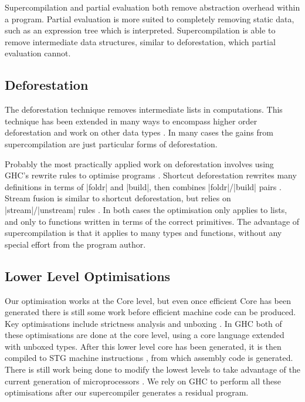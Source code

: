 \documentclass[draft]{sigplanconf}
\begin{document}
Supercompilation and partial evaluation both remove abstraction overhead within a program. Partial evaluation is more suited to completely removing static data, such as an expression tree which is interpreted. Supercompilation is able to remove intermediate data structures, similar to deforestation, which partial evaluation cannot.

\subsection{Deforestation}

The deforestation technique \cite{wadler:deforestation} removes intermediate lists in computations. This technique has been extended in many ways to encompass higher order deforestation \cite{marlow:higher_order_deforestation} and work on other data types \cite{coutts:string_fusion}. In many cases the gains from supercompilation are just particular forms of deforestation.

Probably the most practically applied work on deforestation involves using GHC's rewrite rules to optimise programs \cite{spj:rules}. Shortcut deforestation rewrites many definitions in terms of |foldr| and |build|, then combines |foldr|/|build| pairs \cite{gill:shortcut_deforestation}. Stream fusion is similar to shortcut deforestation, but relies on |stream|/|unstream| rules \cite{coutts:stream_fusion}. In both cases the optimisation only applies to lists, and only to functions written in terms of the correct primitives. The advantage of supercompilation is that it applies to many types and functions, without any special effort from the program author.

\subsection{Lower Level Optimisations}

Our optimisation works at the Core level, but even once efficient Core has been generated there is still some work before efficient machine code can be produced. Key optimisations include strictness analysis and unboxing \cite{spj:unboxing}. In GHC both of these optimisations are done at the core level, using a core language extended with unboxed types. After this lower level core has been generated, it is then compiled to STG machine instructions \cite{spj:stg}, from which assembly code is generated. There is still work being done to modify the lowest levels to take advantage of the current generation of microprocessors \cite{marlow:pointer_tagging}. We rely on GHC to perform all these optimisations after our supercompiler generates a residual program.
\end{document}
